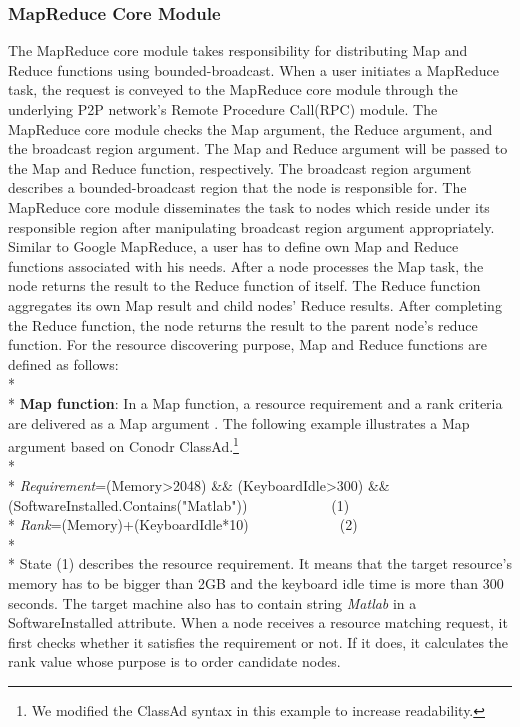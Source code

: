 \documentclass{acm_proc_article-sp}
\begin{document}
\subsubsection{MapReduce Core Module}
The MapReduce core module takes responsibility for distributing Map and Reduce functions using bounded-broadcast. 
When a user initiates a MapReduce task, the request is conveyed to the MapReduce core module through the underlying P2P network's Remote Procedure Call(RPC) module. 
The MapReduce core module checks the Map argument, the Reduce argument, and the broadcast region argument. 
The Map and Reduce argument will be passed to the Map and Reduce function, respectively. 
The broadcast region argument describes a bounded-broadcast region that the node is responsible for. 
The MapReduce core module disseminates the task to nodes which reside under its responsible region after manipulating broadcast region argument appropriately.
Similar to Google MapReduce, a user has to define own Map and Reduce functions associated with his needs. 
After a node processes the Map task, the node returns the result to the Reduce function of itself.
The Reduce function aggregates its own Map result and child nodes' Reduce results. 
After completing the Reduce function, the node returns the result to the parent node's reduce function.
For the resource discovering purpose, Map and Reduce functions are defined as follows:\\*\\*
\textbf{Map function}: In a Map function, a resource requirement and a rank criteria are delivered as a Map argument .
The following example illustrates a Map argument based on Conodr ClassAd.\footnote{We modified the ClassAd syntax in this example to increase readability.}\\*\\*
\textit{Requirement}=(Memory>2048) \&\& (KeyboardIdle>300) \&\& (SoftwareInstalled.Contains("Matlab"))\ \ \ \ \ \ \ \ \ \ \ \ (1)\\*
\textit{Rank}=(Memory)+(KeyboardIdle*10)\ \ \ \ \ \ \ \ \ \ \ \ \ (2)\\*\\*
State (1) describes the resource requirement. It means that the target resource's memory has to be bigger than 2GB and the keyboard idle time is more than 300 seconds.
The target machine also has to contain string \textit{Matlab} in a SoftwareInstalled attribute.
When a node receives a resource matching request, it first checks whether it satisfies the requirement or not. If it does, it calculates the rank value whose purpose is to order candidate nodes.
\end{document}
